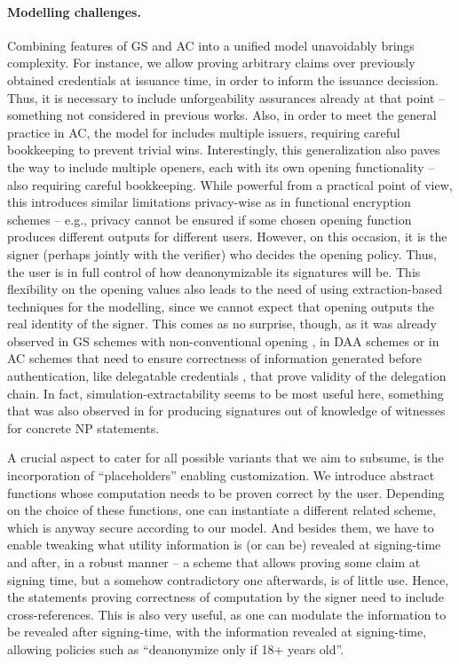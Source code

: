 \paragraph{Modelling challenges.} %
Combining features of GS and AC into a unified model unavoidably brings
complexity. For instance, we allow proving arbitrary claims over previously
obtained credentials at issuance time, in order to inform the issuance
decission. Thus, it is necessary to
include unforgeability assurances already at that point -- something not
considered in previous works. Also, in order to meet the general practice in AC,
the model for \UAS includes multiple issuers, requiring careful bookkeeping to
prevent trivial wins. Interestingly, this generalization also paves the way to
include multiple openers, each with its own opening functionality -- also
requiring careful bookkeeping. While powerful from a practical point of view,
this introduces similar limitations privacy-wise as in functional encryption
schemes \needcite -- e.g., privacy cannot be ensured if some chosen opening
function produces different outputs for different users. However, on this
occasion, it is the signer (perhaps jointly with the verifier) who decides the
opening policy. Thus, the user is in full control of how deanonymizable its
signatures will be. This flexibility on the opening values also leads to the
need of using extraction-based techniques for the modelling, since we cannot
expect that opening outputs the real identity of the signer. This comes as no
surprise, though, as it was already observed in GS schemes with non-conventional
opening \cite{dl21}, in DAA schemes \cite{cdl16,cdl16b} or in AC schemes that
need to ensure correctness of information generated before authentication, like
delegatable credentials \cite{bcc+09}, that prove validity of the delegation
chain. In fact, simulation-extractability seems to be most useful here,
something that was also observed in \cite{cl06} for producing signatures out of
knowledge of witnesses for concrete NP statements.

A crucial aspect to cater for all possible variants that we aim to subsume, is
the incorporation of ``placeholders'' enabling customization. We introduce abstract
functions whose computation needs to be proven correct by the user. Depending on
the choice of these functions, one can instantiate a different related scheme,
which is anyway secure according to our \UAS model. And
besides them, we have to enable tweaking what utility information is (or can be)
revealed at signing-time and after, in a robust manner -- a scheme that allows
proving some claim at signing time, but a somehow contradictory one afterwards,
is of little use. Hence, the statements proving correctness of computation by
the signer need to include cross-references. This is also very useful, as one
can modulate the information to be revealed after signing-time, with the
information revealed at signing-time, allowing policies such as ``deanonymize
only if 18+ years old''.

